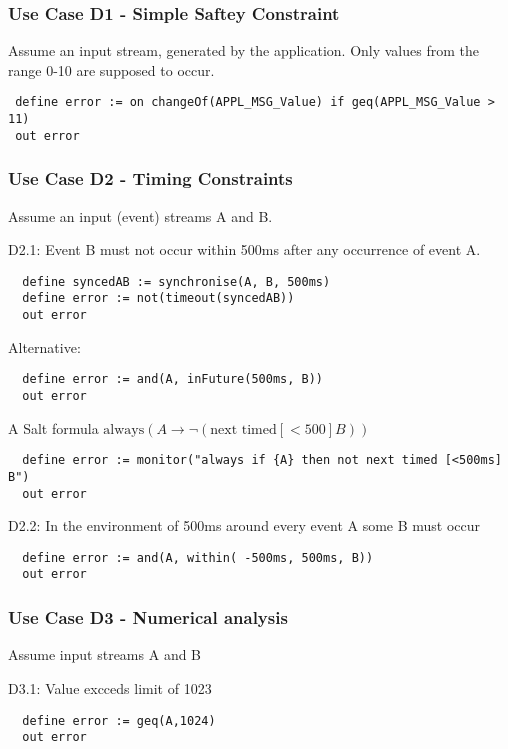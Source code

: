 \subsubsection{Use Case D1 - Simple Saftey Constraint}

Assume an input stream, generated by the application. 
Only values from the range 0-10 are supposed to occur.

\begin{lstlisting}
 define error := on changeOf(APPL_MSG_Value) if geq(APPL_MSG_Value > 11)
 out error
\end{lstlisting}

\subsubsection{Use Case D2 - Timing Constraints}

Assume an input (event) streams A and B.

D2.1: Event B must not occur within 500ms after any occurrence of event A.
  
\begin{lstlisting}
  define syncedAB := synchronise(A, B, 500ms)
  define error := not(timeout(syncedAB))
  out error
\end{lstlisting}

Alternative:
\begin{lstlisting}
  define error := and(A, inFuture(500ms, B))
  out error
\end{lstlisting}

A Salt formula $\text{always} (A → ¬(\text{next timed}[<500] B))$
\begin{lstlisting}
  define error := monitor("always if {A} then not next timed [<500ms] B")
  out error
\end{lstlisting}

D2.2: In the environment of 500ms around every event A some B must occur
\begin{lstlisting}
  define error := and(A, within( -500ms, 500ms, B))
  out error
\end{lstlisting}

\subsubsection{Use Case D3 - Numerical analysis}

Assume input streams A and B

D3.1: Value excceds limit of 1023
\begin{lstlisting}
  define error := geq(A,1024)
  out error
\end{lstlisting}

